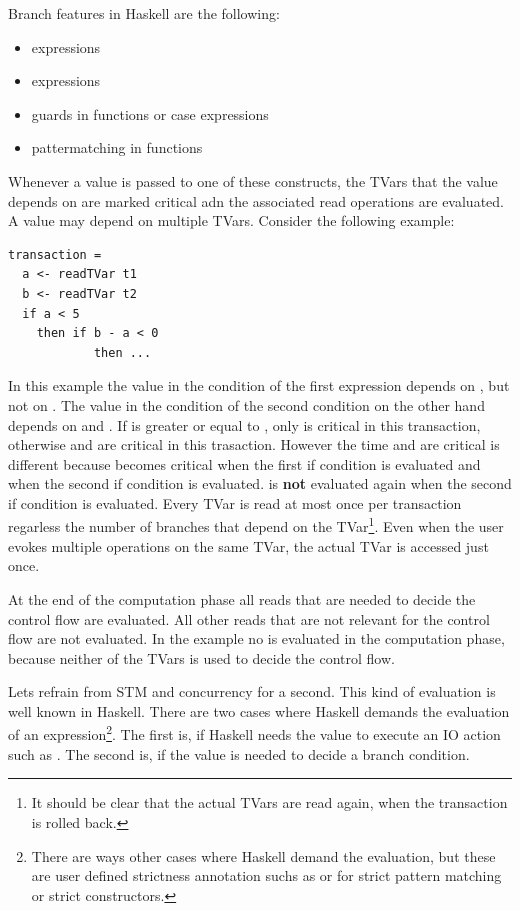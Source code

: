 Branch features in Haskell are the following:
\begin{itemize}
 \item {} expressions
 \item {} expressions
 \item guards in functions or case expressions
 \item pattermatching in functions
\end{itemize}
Whenever a value is passed to one of these constructs, the TVars that the value depends on are marked critical
adn the associated read operations are evaluated.
A value may depend on multiple TVars. Consider the following example:
\begin{lstlisting}
transaction =
  a <- readTVar t1
  b <- readTVar t2
  if a < 5
    then if b - a < 0 
            then ...
\end{lstlisting}
In this example the value in the condition of the first  expression depends on , but not
on . The value in the condition of the second  condition on the other hand 
depends on  and . If  is greater or equal to , only  is critical
in this transaction, otherwise  and  are critical in this trasaction. However the time 
 and  are critical is different because  becomes critical when the first if 
condition is evaluated and  when the second if condition is evaluated.  is \textbf{not} 
evaluated again when the second if condition is evaluated. Every TVar is read at most once per 
transaction regarless the number of branches that depend on the TVar\footnote{It should be clear that the
actual TVars are read again, when the transaction is rolled back.}. Even when the user evokes
multiple  operations on the same TVar, the actual TVar is accessed just once. 

At the end of the computation phase all reads that are needed to decide the control flow are evaluated. 
All other reads that are not relevant for the control flow are not evaluated. 
In the  example no  is evaluated in the computation phase, because neither of the 
TVars is used to decide the control flow.

Lets refrain from STM and concurrency for a second. This kind of evaluation is well known in Haskell. There 
are two cases where Haskell demands the evaluation of an expression\footnote{There are ways other cases where Haskell
demand the evaluation, but these are user defined strictness annotation suchs as  or \code{!} for strict 
pattern matching or strict constructors.}. The first is, if Haskell needs the value
to execute an IO action such as . The second is, if the value is needed to decide a branch condition.

